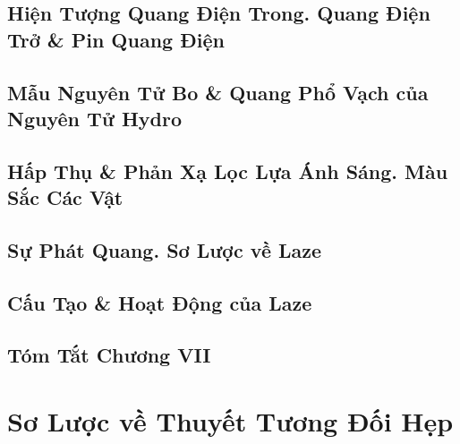 \documentclass{article}
\numberwithin{equation}{section}
\begin{document}

\subsection{Hiện Tượng Quang Điện Trong. Quang Điện Trở \& Pin Quang Điện}


\subsection{Mẫu Nguyên Tử Bo \& Quang Phổ Vạch của Nguyên Tử Hydro}


\subsection{Hấp Thụ \& Phản Xạ Lọc Lựa Ánh Sáng. Màu Sắc Các Vật}


\subsection{Sự Phát Quang. Sơ Lược về Laze}


\subsection{Cấu Tạo \& Hoạt Động của Laze}


\subsection{Tóm Tắt Chương VII}


\section{Sơ Lược về Thuyết Tương Đối Hẹp}
\end{document}
